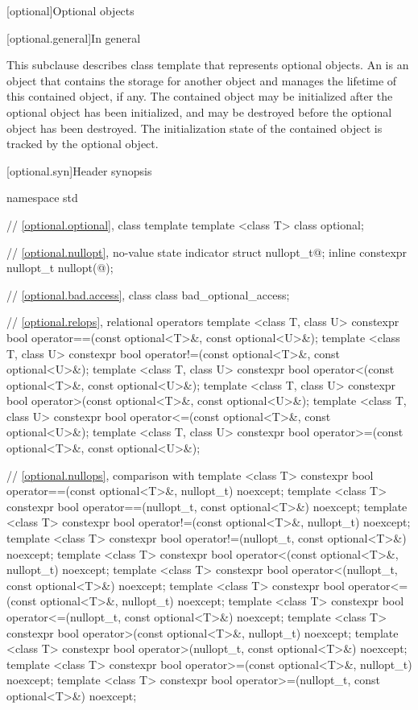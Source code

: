 [optional]{Optional objects}

[optional.general]{In general}

\pnum
This subclause describes class template  that represents
optional objects.
An  is an
object that contains the storage for another object and manages the lifetime of
this contained object, if any. The contained object may be initialized after
the optional object has been initialized, and may be destroyed before the
optional object has been destroyed. The initialization state of the contained
object is tracked by the optional object.

[optional.syn]{Header  synopsis}

%
%
\begin{codeblock}
namespace std {
  // \ref{optional.optional}, class template 
  template <class T>
    class optional;

  // \ref{optional.nullopt}, no-value state indicator
  struct nullopt_t{@\seebelow@};
  inline constexpr nullopt_t nullopt(@\unspec@);

  // \ref{optional.bad.access}, class 
  class bad_optional_access;

  // \ref{optional.relops}, relational operators
  template <class T, class U>
  constexpr bool operator==(const optional<T>&, const optional<U>&);
  template <class T, class U>
  constexpr bool operator!=(const optional<T>&, const optional<U>&);
  template <class T, class U>
  constexpr bool operator<(const optional<T>&, const optional<U>&);
  template <class T, class U>
  constexpr bool operator>(const optional<T>&, const optional<U>&);
  template <class T, class U>
  constexpr bool operator<=(const optional<T>&, const optional<U>&);
  template <class T, class U>
  constexpr bool operator>=(const optional<T>&, const optional<U>&);

  // \ref{optional.nullops}, comparison with 
  template <class T> constexpr bool operator==(const optional<T>&, nullopt_t) noexcept;
  template <class T> constexpr bool operator==(nullopt_t, const optional<T>&) noexcept;
  template <class T> constexpr bool operator!=(const optional<T>&, nullopt_t) noexcept;
  template <class T> constexpr bool operator!=(nullopt_t, const optional<T>&) noexcept;
  template <class T> constexpr bool operator<(const optional<T>&, nullopt_t) noexcept;
  template <class T> constexpr bool operator<(nullopt_t, const optional<T>&) noexcept;
  template <class T> constexpr bool operator<=(const optional<T>&, nullopt_t) noexcept;
  template <class T> constexpr bool operator<=(nullopt_t, const optional<T>&) noexcept;
  template <class T> constexpr bool operator>(const optional<T>&, nullopt_t) noexcept;
  template <class T> constexpr bool operator>(nullopt_t, const optional<T>&) noexcept;
  template <class T> constexpr bool operator>=(const optional<T>&, nullopt_t) noexcept;
  template <class T> constexpr bool operator>=(nullopt_t, const optional<T>&) noexcept;

}
\end{codeblock}
